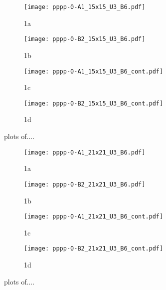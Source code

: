 \begin{figure}
  \begin{subfigure}{.5\textwidth}
    \centering
    \texttt{[image: pppp-0-A1\_15x15\_U3\_B6.pdf]}
    \caption{1a}
    \label{fig:sfig1}
  \end{subfigure}%
  \begin{subfigure}{.5\textwidth}
    \centering
    \texttt{[image: pppp-0-B2\_15x15\_U3\_B6.pdf]}
    \caption{1b}
    \label{fig:sfig2}
  \end{subfigure}
  \begin{subfigure}{.5\textwidth}
      \centering
      \texttt{[image: pppp-0-A1\_15x15\_U3\_B6\_cont.pdf]}
      \caption{1c}
      \label{fig:sfig3}
  \end{subfigure}
  \begin{subfigure}{.5\textwidth}
      \centering
      \texttt{[image: pppp-0-B2\_15x15\_U3\_B6\_cont.pdf]}
      \caption{1d}
      \label{fig:sfig4}
  \end{subfigure}
  \caption{plots of....}
  \label{fig:fig}
\end{figure}

\begin{figure}
  \begin{subfigure}{.5\textwidth}
    \centering
    \texttt{[image: pppp-0-A1\_21x21\_U3\_B6.pdf]}
    \caption{1a}
    \label{fig:sfig1}
  \end{subfigure}%
  \begin{subfigure}{.5\textwidth}
    \centering
    \texttt{[image: pppp-0-B2\_21x21\_U3\_B6.pdf]}
    \caption{1b}
    \label{fig:sfig2}
  \end{subfigure}
  \begin{subfigure}{.5\textwidth}
      \centering
      \texttt{[image: pppp-0-A1\_21x21\_U3\_B6\_cont.pdf]}
      \caption{1c}
      \label{fig:sfig3}
  \end{subfigure}
  \begin{subfigure}{.5\textwidth}
      \centering
      \texttt{[image: pppp-0-B2\_21x21\_U3\_B6\_cont.pdf]}
      \caption{1d}
      \label{fig:sfig4}
  \end{subfigure}
  \caption{plots of....}
  \label{fig:fig}
\end{figure}


